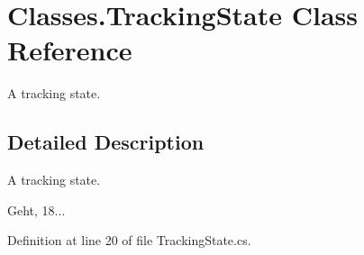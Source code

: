 \section{Classes.\-Tracking\-State Class Reference}
\label{class_classes_1_1_tracking_state}


A tracking state.  




\subsection{Detailed Description}
A tracking state. 

Geht, 18... 

Definition at line 20 of file Tracking\-State.\-cs.

